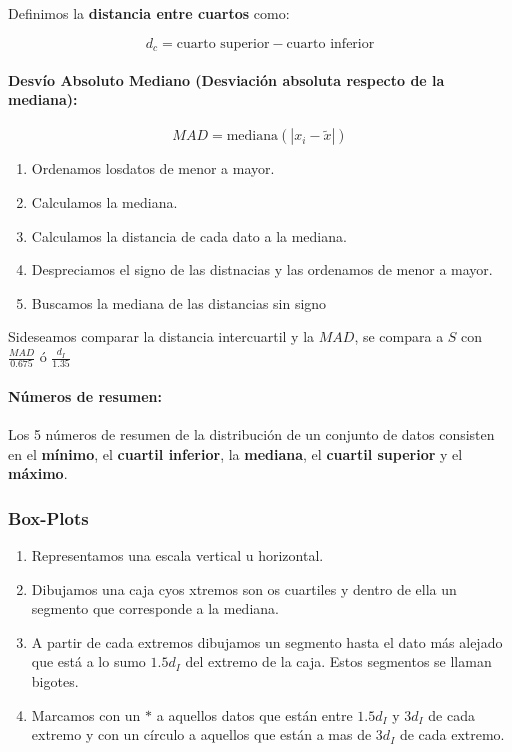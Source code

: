 Definimos la \textbf{distancia entre cuartos} como:

$$d_c = \text{cuarto superior} - \text{cuarto inferior}$$

\paragraph{Desvío Absoluto Mediano (Desviación absoluta respecto de la mediana):}
$$MAD = \text{mediana}(|x_i-\tilde{x}|)$$

\begin{enumerate}
	\item Ordenamos losdatos de menor a mayor.
	\item Calculamos la mediana.
	\item Calculamos la distancia de cada dato a la mediana.
	\item Despreciamos el signo de las distnacias y las ordenamos de menor a mayor.
	\item Buscamos la mediana de las distancias sin signo
\end{enumerate}

Sideseamos comparar la distancia intercuartil y la $MAD$, se compara a $S$ con $\frac{MAD}{0.675}$ ó $\frac{d_I}{1.35}$

\paragraph{Números de resumen:} Los 5 números de resumen de la distribución de un conjunto de datos consisten en el \textbf{mínimo}, el \textbf{cuartil inferior}, la \textbf{mediana}, el \textbf{cuartil superior} y el \textbf{máximo}.

\subsubsection{Box-Plots}
\begin{enumerate}
	\item Representamos una escala vertical u horizontal.
	\item Dibujamos una caja cyos xtremos son os cuartiles y dentro de ella un segmento que corresponde a la mediana.
	\item A partir de cada extremos dibujamos un segmento hasta el dato más alejado que está a lo sumo $1.5d_I$ del extremo de la caja. Estos segmentos se llaman bigotes.
	\item Marcamos con un $*$ a aquellos datos que están entre $1.5d_I$ y $3d_I$ de cada extremo y con un círculo a aquellos que están a mas de $3d_I$ de cada extremo.
\end{enumerate}

